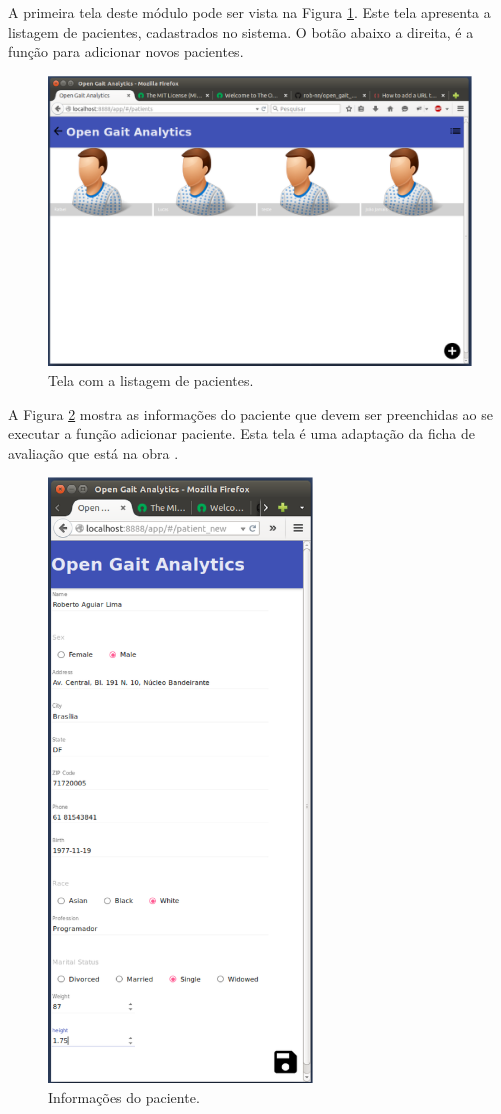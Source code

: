 A primeira tela deste módulo pode ser vista na Figura \ref{tela2}. Este tela apresenta a listagem de pacientes, cadastrados no sistema. O botão abaixo a direita, é a função para adicionar novos pacientes.

\begin{figure}[ht]
	\centering
	\includegraphics[width=15cm]{figuras/tela2.eps}
	\caption{Tela com a listagem de pacientes.}
	\label{tela2}
\end{figure}

A Figura \ref{tela3} mostra as informações do paciente que devem ser preenchidas ao se executar a função adicionar paciente. Esta tela é uma adaptação da ficha de avaliação que está na obra .

\begin{figure}[ht]
	\centering
	\includegraphics[width=7cm]{figuras/tela3.eps}
	\caption{Informações do paciente.}
	\label{tela3}
\end{figure}

